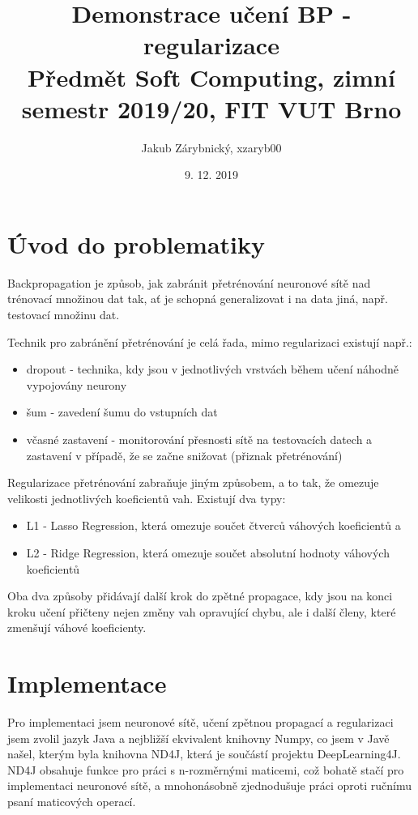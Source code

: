 \documentclass[titlepage]{article}
\author{Jakub Zárybnický, xzaryb00}
\date{9. 12. 2019}
\title{Demonstrace učení BP - regularizace\\\medskip
\large Předmět Soft Computing, zimní semestr 2019/20, FIT VUT Brno}
\begin{document}
\maketitle

\section{Úvod do problematiky}
\label{sec:org66c8824}
Backpropagation je způsob, jak zabránit přetrénování neuronové sítě nad
trénovací množinou dat tak, ať je schopná generalizovat i na data jiná,
např. testovací množinu dat.

Technik pro zabránění přetrénování je celá řada, mimo regularizaci existují
např.:

\begin{itemize}
\item dropout - technika, kdy jsou v jednotlivých vrstvách během učení náhodně
vypojovány neurony
\item šum - zavedení šumu do vstupních dat
\item včasné zastavení - monitorování přesnosti sítě na testovacích datech a
zastavení v případě, že se začne snižovat (přiznak přetrénování)
\end{itemize}

Regularizace přetrénování zabraňuje jiným způsobem, a to tak, že omezuje
velikosti jednotlivých koeficientů vah. Existují dva typy:

\begin{itemize}
\item L1 - Lasso Regression, která omezuje součet čtverců váhových koeficientů a
\item L2 - Ridge Regression, která omezuje součet absolutní hodnoty váhových koeficientů
\end{itemize}

Oba dva způsoby přidávají další krok do zpětné propagace, kdy jsou na konci
kroku učení přičteny nejen změny vah opravující chybu, ale i další členy, které
zmenšují váhové koeficienty.

\newpage
\section{Implementace}
\label{sec:org5f271a6}
Pro implementaci jsem neuronové sítě, učení zpětnou propagací a regularizaci
jsem zvolil jazyk Java a nejbližší ekvivalent knihovny Numpy, co jsem v Javě
našel, kterým byla knihovna ND4J, která je součástí projektu
DeepLearning4J. ND4J obsahuje funkce pro práci s n-rozměrnými maticemi, což
bohatě stačí pro implementaci neuronové sítě, a mnohonásobně zjednodušuje práci
oproti ručnímu psaní maticových operací.
\end{document}
